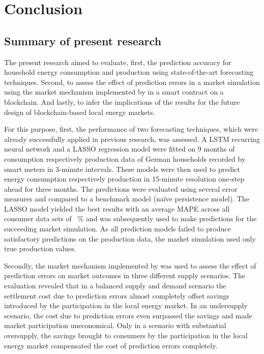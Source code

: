 
\section{Conclusion}\label{Sec:Conc}




\subsection{Summary of present research}\label{Sec:Conclusion;Subsec:Summary}

The present research aimed to evaluate, first, the prediction accuracy for household energy consumption and production using state-of-the-art forecasting techniques. Second, to assess the effect of prediction errors in a market simulation using the market mechanism implemented by \citet{Mengelkamp:2018a} in a smart contract on a blockchain. And lastly, to infer the implications of the results for the future design of blockchain-based local energy markets.

For this purpose, first, the performance of two forecasting techniques, which were already successfully applied in previous research, was assessed. A LSTM recurring neural network and a LASSO regression model were fitted on 9 months of consumption respectively production data of German households recorded by smart meters in 3-minute intervals. These models were then used to predict energy consumption respectively production in 15-minute resolution one-step ahead for three months. The predictions were evaluated using several error measures and compared to a benchmark model (na\"ive persistence model). The LASSO model yielded the best results with an average MAPE across all consumer data sets of ~\% and was subsequently used to make predictions for the succeeding market simulation. As all prediction models failed to produce satisfactory predictions on the production data, the market simulation used only true production values.

Secondly, the market mechanism implemented by \citet{Mengelkamp:2018a} was used to assess the effect of prediction errors on market outcomes in three different supply scenarios. The evaluation revealed that in a balanced supply and demand scenario the settlement cost due to prediction errors almost completely offset savings introduced by the participation in the local energy market. In an undersupply scenario, the cost due to prediction errors even surpassed the savings and made market participation uneconomical. Only in a scenario with substantial oversupply, the savings brought to consumers by the participation in the local energy market compensated the cost of prediction errors completely.

